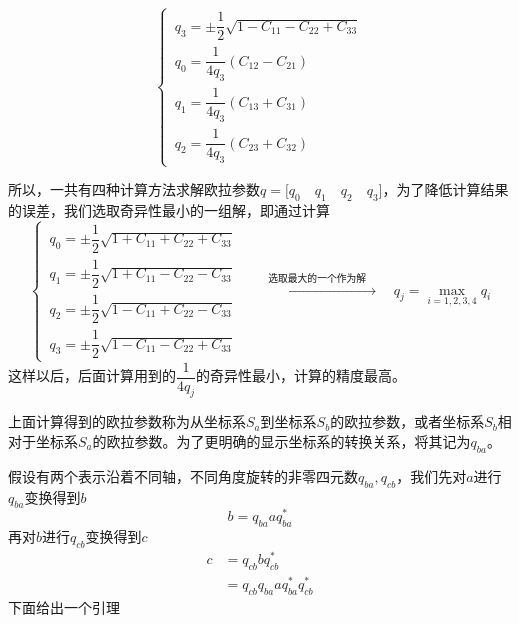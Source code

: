 \begin{equation}
	\begin{cases}
		\, q_3 = \pm \dfrac{1}{2} \sqrt{1 - C_{11} - C_{22} + C_{33}} \\[0.8em]
		\, q_0 = \dfrac{1}{4q_3}(C_{12} - C_{21}) \\[0.8em]
		\, q_1 = \dfrac{1}{4q_3}(C_{13} + C_{31}) \\[0.8em]
		\, q_2 = \dfrac{1}{4q_3}(C_{23} + C_{32})
	\end{cases}
\end{equation}

所以，一共有四种计算方法求解欧拉参数$q = \big[ q_0 \quad q_1 \quad q_2 \quad q_3 \big]$，为了降低计算结果的误差，我们选取奇异性最小的一组解，即通过计算
\begin{equation}
	\begin{cases}
		\, q_0 =  \pm \dfrac{1}{2} \sqrt{1 + C_{11} + C_{22} + C_{33}} \\[0.8em]
		\, q_1 = \pm \dfrac{1}{2} \sqrt{1 + C_{11} - C_{22} - C_{33}} \\[0.8em]
		\, q_2 = \pm \dfrac{1}{2} \sqrt{1 - C_{11} + C_{22} - C_{33}} \\[0.8em]
		\, q_3 = \pm \dfrac{1}{2} \sqrt{1 - C_{11} - C_{22} + C_{33}}
	\end{cases}
\quad 
\xrightarrow{\quad \textstyle \mbox{选取最大的一个作为解} \quad } \quad 
	q_j = \max_{i = 1,2,3,4} q_i
\end{equation}
这样以后，后面计算用到的$\dfrac{1}{4q_j}$的奇异性最小，计算的精度最高。
\vspace*{0.5em}

上面计算得到的欧拉参数称为从坐标系$S_a$到坐标系$S_b$的欧拉参数，或者坐标系$S_b$相对于坐标系$S_a$的欧拉参数。为了更明确的显示坐标系的转换关系，将其记为$q_{ba}$。
\vspace*{1em}


\sssection[相继转动的欧拉参数表示]

假设有两个表示沿着不同轴，不同角度旋转的非零四元数$q_{ba}, q_{cb}$，我们先对$a$进行$q_{ba}$变换得到$b$
\begin{equation*}
	b = q_{ba} a q_{ba}^*
\end{equation*}
再对$b$进行$q_{cb}$变换得到$c$
\begin{align*}
	c &= q_{cb} b q_{cb}^* \\
	&= q_{cb}q_{ba} a q_{ba}^* q_{cb}^*
\end{align*}
下面给出一个引理

